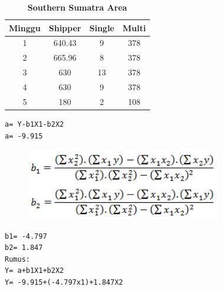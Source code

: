\begin{enumerate}
\begin{table}[!ht]
  \centering
  \caption{\textbf{Southern Sumatra Area}}
\begin{tabular}{|c|c|c|c|}
\hline
Minggu & Shipper & Single & Multi \\ \hline
1      & 640.43     & 9     & 378   \\ \hline
2      & 665.96     & 8     & 378   \\ \hline
3      & 630     & 13     & 378   \\ \hline
4      & 630     & 9     & 378   \\ \hline
5      & 180     & 2     & 108   \\ \hline
\end{tabular}
\end{table}
\begin{lstlisting}
a= Y-b1X1-b2X2      
a= -9.915
\end{lstlisting}
\begin{figure}[!ht]
\includegraphics[scale=0.6]{figures/b1b2.JPG}
    \label{Figure4}
\end{figure}
\begin{lstlisting}
b1= -4.797
b2= 1.847
Rumus:
Y= a+b1X1+b2X2
Y= -9.915+(-4.797x1)+1.847X2
\end{lstlisting}


\end{enumerate}
